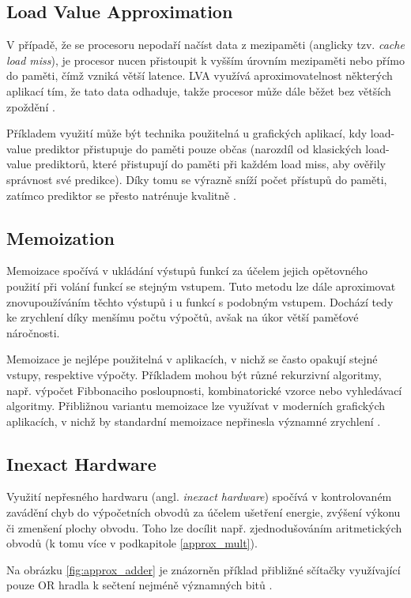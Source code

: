 \subsection*{Load Value Approximation}
V případě, že se procesoru nepodaří načíst data z mezipaměti (anglicky tzv. \textit{cache load miss}), je procesor nucen přistoupit k vyšším úrovním mezipaměti nebo přímo do paměti, čímž vzniká větší latence. LVA využívá aproximovatelnost některých aplikací tím, že tato data odhaduje, takže procesor může dále běžet bez větších zpoždění \cite{ac_techniques}.

Příkladem využití může být technika použitelná u grafických aplikací, kdy load-value prediktor přistupuje do paměti pouze občas (narozdíl od klasických load-value prediktorů, které přistupují do paměti při každém load miss, aby ověřily správnost své predikce). Díky tomu se výrazně sníží počet přístupů do paměti, zatímco prediktor se přesto natrénuje kvalitně \cite{load_value_approx}.

\subsection*{Memoization}
Memoizace spočívá v ukládání výstupů funkcí za účelem jejich opětovného použití při volání funkcí se stejným vstupem. Tuto metodu lze dále aproximovat znovupoužíváním těchto výstupů i u funkcí s podobným vstupem. Dochází tedy ke zrychlení díky menšímu počtu výpočtů, avšak na úkor větší paměťové náročnosti.

Memoizace je nejlépe použitelná v aplikacích, v nichž se často opakují stejné vstupy, respektive výpočty. Příkladem mohou být různé rekurzivní algoritmy, např. výpočet Fibbonaciho posloupnosti, kombinatorické vzorce nebo vyhledávací algoritmy. Přibližnou variantu memoizace lze využívat v moderních grafických aplikacích, v nichž by standardní memoizace nepřinesla významné zrychlení \cite{ac_techniques}.

\subsection*{Inexact Hardware}
Využití nepřesného hardwaru (angl. \textit{inexact hardware}) spočívá v kontrolovaném zavádění chyb do výpočetních obvodů za účelem ušetření energie, zvýšení výkonu či zmenšení plochy obvodu. Toho lze docílit např. zjednodušováním aritmetických obvodů (k tomu více v podkapitole \ref{approx_mult}).

Na obrázku \ref{fig:approx_adder} je znázorněn příklad přibližné sčítačky využívající pouze OR hradla k sečtení nejméně významných bitů \cite{log_mults}.

